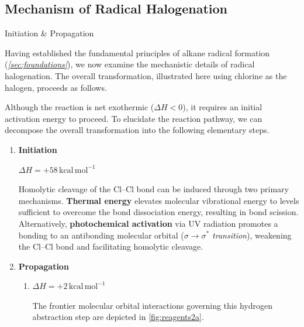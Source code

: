 \documentclass[10pt]{article}
\begin{document}
  \subsection{Mechanism of Radical Halogenation}

    \begin{core}[label=core:two_step_prop]{Initiation \& Propagation}

      Having established the fundamental principles of alkane radical formation (\textit{\autoref{sec:foundations}}), we now examine the mechanistic details of radical halogenation. The overall transformation, illustrated here using chlorine as the halogen, proceeds as follows.


      Although the reaction is net exothermic ($\Delta H < 0$), it requires an initial activation energy to proceed. To elucidate the reaction pathway, we can decompose the overall transformation into the following elementary steps.

      \begin{enumerate}[label=(\arabic*)]

        \item \textbf{Initiation}
        
        \hspace{5mm}$\Delta H = +58\,\text{kcal}\,\text{mol}^{-1}$

        Homolytic cleavage of the Cl--Cl bond can be induced through two primary mechanisms. \textbf{Thermal energy} elevates molecular vibrational energy to levels sufficient to overcome the bond dissociation energy, resulting in bond scission. Alternatively, \textbf{photochemical activation} via UV radiation promotes a bonding  to an antibonding molecular orbital (\textit{$\sigma \to \sigma^*$ transition}), weakening the Cl--Cl bond and facilitating homolytic cleavage.

        \item \textbf{Propagation}

          \begin{enumerate}

            \item {}\hspace{5mm}$\Delta H = +2\,\text{kcal}\,\text{mol}^{-1}$

            The frontier molecular orbital interactions governing this hydrogen abstraction step are depicted in \autoref{fig:reagents2a}.


\end{enumerate}
\end{enumerate}
\end{core}
\end{document}
